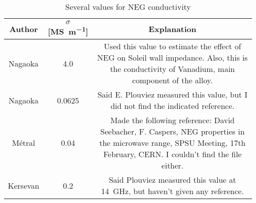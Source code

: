 \begin{table}[!t]
 \centering
 \caption{Several values for NEG conductivity}
 \label{tab:neg_salad}
\begin{tabular}{ccc}
Author                 & $\sigma$ [\si{\mega\siemens\per\meter}] & Explanation \\\hline
Nagaoka \cite{nagaoka2004}  & 4.0    & \begin{minipage}{0.6\textwidth}
                                        \vspace{1mm}
                                        Used this value to estimate the effect of NEG on Soleil wall impedance. Also, this is the conductivity of Vanadium, main component of the alloy.
                                        \vspace{1mm}
                                       \end{minipage} \\\hline
Nagaoka \cite{nagaoka2004}  & 0.0625 & \begin{minipage}{0.6\textwidth}
                                        \vspace{1mm}
                                        Said E. Plouviez measured this value, but I did not find the indicated reference.
                                        \vspace{1mm}
                                       \end{minipage} \\\hline
Métral \cite{metral_talk2011}& 0.04  & \begin{minipage}{0.6\textwidth}
                                        \vspace{1mm}
                                        Made the following reference: David Seebacher, F. Caspers, NEG properties in the microwave range, SPSU Meeting, 17th February, CERN. I couldn't find the file either.
                                        \vspace{1mm}
                                       \end{minipage} \\\hline  
Kersevan \cite{kersevan2002} & 0.2   & \begin{minipage}{0.6\textwidth}
                                        \vspace{1mm}
                                        Said Plouviez measured this value at \SI{14}{\giga\hertz}, but haven't given any reference.
                                        \vspace{1mm}
                                       \end{minipage} \\\hline                                                    
\end{tabular}
\end{table}


